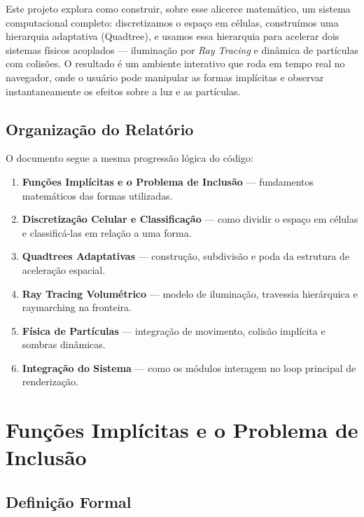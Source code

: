 \documentclass[11pt,a4paper]{article}
\theoremstyle{plain}
\theoremstyle{definition}
\begin{document}
Este projeto explora como construir, sobre esse alicerce matemático, um sistema
computacional completo: discretizamos o espaço em células, construímos uma
hierarquia adaptativa (Quadtree), e usamos essa hierarquia para acelerar dois
sistemas físicos acoplados --- iluminação por \textit{Ray Tracing} e dinâmica de
partículas com colisões. O resultado é um ambiente interativo que roda em tempo
real no navegador, onde o usuário pode manipular as formas implícitas e observar
instantaneamente os efeitos sobre a luz e as partículas.

\subsection{Organização do Relatório}

O documento segue a mesma progressão lógica do código:

\begin{enumerate}[label=\S\arabic*.]
    \item \textbf{Funções Implícitas e o Problema de Inclusão} --- fundamentos
    matemáticos das formas utilizadas.
    \item \textbf{Discretização Celular e Classificação} --- como dividir o
    espaço em células e classificá-las em relação a uma forma.
    \item \textbf{Quadtrees Adaptativas} --- construção, subdivisão e poda da
    estrutura de aceleração espacial.
    \item \textbf{Ray Tracing Volumétrico} --- modelo de iluminação, travessia
    hierárquica e raymarching na fronteira.
    \item \textbf{Física de Partículas} --- integração de movimento, colisão
    implícita e sombras dinâmicas.
    \item \textbf{Integração do Sistema} --- como os módulos interagem no loop
    principal de renderização.
\end{enumerate}

\section{Funções Implícitas e o Problema de Inclusão}
\label{sec:implicitas}

\subsection{Definição Formal}
\end{document}

